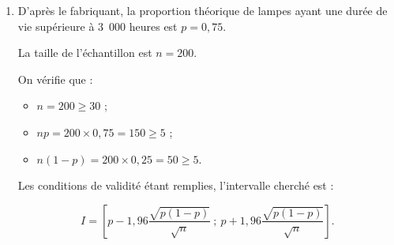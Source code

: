 \begin{corrige}
\begin{enumerate}
{\begin{itemize}
               \end{itemize}
          }
     \end{enumerate}
     \par
     \par
     \begin{enumerate}
          \item %
          D'après le fabriquant, la proportion théorique de lampes ayant une durée de vie supérieure à 3\ 000 heures est $p=0,75$.
          \par
          La taille  de l'échantillon est $n=200$.
          \par
          On vérifie que :
          \par
          \begin{itemize}
               \item $n=200 \geqslant 30$ ;
               \item $np=200 \times 0,75=150 \geqslant 5$ ;
               \item $n(1-p)=200 \times 0,25=50 \geqslant 5$.
          \end{itemize}
          \par
          Les conditions de validité étant remplies, l'intervalle cherché est :
          \par
          \[ I=\left[p-1,96\dfrac{\sqrt{p(1-p)}}{\sqrt{n}}~;~p+1,96\dfrac{\sqrt{p(1-p)}}{\sqrt{n}}\right]. \]

\end{enumerate}
\end{corrige}
